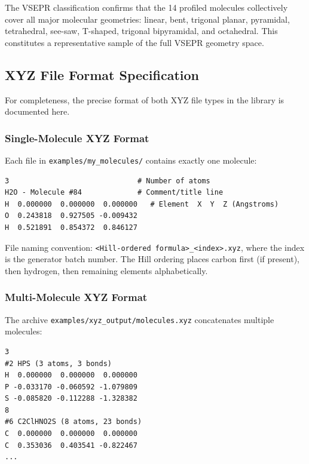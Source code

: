 \documentclass[11pt,a4paper]{article}
\begin{document}
\noindent The VSEPR classification confirms that the 14 profiled
molecules collectively cover all major molecular geometries:
linear, bent, trigonal planar, pyramidal, tetrahedral, see-saw,
T-shaped, trigonal bipyramidal, and octahedral.  This constitutes a
representative sample of the full VSEPR geometry space.

\subsection{XYZ File Format Specification}

For completeness, the precise format of both XYZ file types in the
library is documented here.

\subsubsection{Single-Molecule XYZ Format}

Each file in \texttt{examples/my\_molecules/} contains exactly one
molecule:

\begin{lstlisting}[title={\textbf{Single-molecule XYZ format (e.g.\ H2O\_84.xyz)}}]
3                              # Number of atoms
H2O - Molecule #84             # Comment/title line
H  0.000000  0.000000  0.000000   # Element  X  Y  Z (Angstroms)
O  0.243818  0.927505 -0.009432
H  0.521891  0.854372  0.846127
\end{lstlisting}

\noindent File naming convention:
\texttt{<Hill-ordered formula>\_<index>.xyz}, where the index is the
generator batch number.  The Hill ordering places carbon first (if
present), then hydrogen, then remaining elements alphabetically.

\subsubsection{Multi-Molecule XYZ Format}

The archive \texttt{examples/xyz\_output/molecules.xyz} concatenates
multiple molecules:

\begin{lstlisting}[title={\textbf{Multi-molecule XYZ format (molecules.xyz)}}]
3
#2 HPS (3 atoms, 3 bonds)
H  0.000000  0.000000  0.000000
P -0.033170 -0.060592 -1.079809
S -0.085820 -0.112288 -1.328382
8
#6 C2ClHNO2S (8 atoms, 23 bonds)
C  0.000000  0.000000  0.000000
C  0.353036  0.403541 -0.822467
...
\end{lstlisting}
\end{document}
